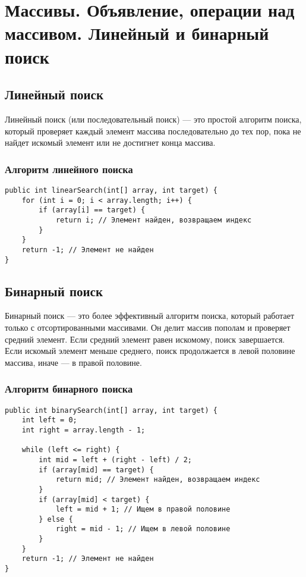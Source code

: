 \documentclass[12pt, a4paper]{article}
\begin{document}
\section{Массивы. Объявление, операции над массивом. Линейный и бинарный поиск}
\subsection*{Линейный поиск}

Линейный поиск (или последовательный поиск) — это простой алгоритм поиска, который проверяет каждый элемент массива последовательно до тех пор, пока не найдет искомый элемент или не достигнет конца массива.

\subsubsection*{Алгоритм линейного поиска}

\begin{verbatim}
public int linearSearch(int[] array, int target) {
    for (int i = 0; i < array.length; i++) {
        if (array[i] == target) {
            return i; // Элемент найден, возвращаем индекс
        }
    }
    return -1; // Элемент не найден
}
\end{verbatim}

\subsection*{Бинарный поиск}
Бинарный поиск — это более эффективный алгоритм поиска, который работает только с отсортированными массивами. Он делит массив пополам и проверяет средний элемент. Если средний элемент равен искомому, поиск завершается. Если искомый элемент меньше среднего, поиск продолжается в левой половине массива, иначе — в правой половине.

\subsubsection*{Алгоритм бинарного поиска}
\begin{verbatim}
public int binarySearch(int[] array, int target) {
    int left = 0;
    int right = array.length - 1;

    while (left <= right) {
        int mid = left + (right - left) / 2;
        if (array[mid] == target) {
            return mid; // Элемент найден, возвращаем индекс
        }
        if (array[mid] < target) {
            left = mid + 1; // Ищем в правой половине
        } else {
            right = mid - 1; // Ищем в левой половине
        }
    }
    return -1; // Элемент не найден
}
\end{verbatim}
\end{document}
